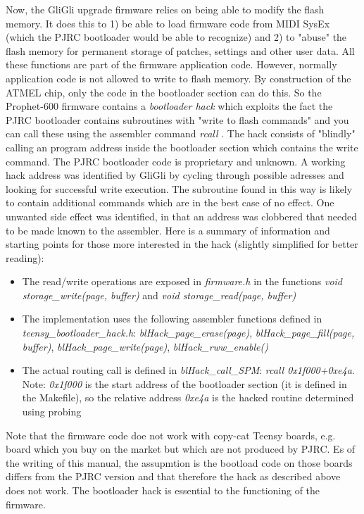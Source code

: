 Now, the GliGli upgrade firmware relies on being able to modify the flash memory. It does this to 1) be able to load firmware code from MIDI SysEx (which the PJRC bootloader would be able to recognize) and 2) to "abuse" the flash memory for permanent storage of patches, settings and other user data. All these functions are part of the firmware application code. However, normally application code is not allowed to write to flash memory. By construction of the ATMEL chip, only the code in the bootloader section can do this. So the Prophet-600 firmware contains a \textit{bootloader hack} which exploits the fact the PJRC bootloader contains subroutines with "write to flash commands" and you can call these using the assembler command \textit{rcall} . The hack consists of "blindly" calling an program address inside the bootloader section which contains the write command. The PJRC bootloader code is proprietary and unknown. A working hack address was identified by GliGli by cycling through possible adresses and looking for successful write execution. The subroutine found in this way is likely to contain additional commands which are in the best case of no effect. One unwanted side effect was identified, in that an address was clobbered that needed to be made known to the assembler. Here is a summary of information and starting points for those more interested in the hack (slightly simplified for better reading):

\begin{itemize}
  \item The read/write operations are exposed in \textit{firmware.h} in the functions \textit{void storage\_write(page, buffer)} and \textit{void storage\_read(page, buffer)} 
  \item The implementation uses the following assembler functions defined in \textit{teensy\_bootloader\_hack.h}: \textit{blHack\_page\_erase(page)}, \textit{blHack\_page\_fill(page, buffer)}, \textit{blHack\_page\_write(page)}, \textit{blHack\_rww\_enable()}
  \item The actual routing call is defined in \textit{blHack\_call\_SPM}: \textit{rcall 0x1f000+0xe4a}. Note: \textit{0x1f000} is the start address of the bootloader section (it is defined in the Makefile), so the relative address \textit{0xe4a} is the hacked routine determined using probing 
\end{itemize} 

Note that the firmware code doe not work with copy-cat Teensy boards, e.g. board which you buy on the market but which are not produced by PJRC. Es of the writing of this manual, the assupmtion is the bootload code on those boards differs from the PJRC version and that therefore the hack as described above does not work. The bootloader hack is essential to the functioning of the firmware.
